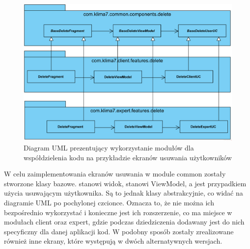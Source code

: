 \begin{figure}[ht!]
  \centering
  \includegraphics[width=\linewidth]{images/modules_example.png}
  \caption[Diagram UML prezentujący wykorzystanie modułów na przykładzie]{Diagram UML prezentujący wykorzystanie modułów dla współdzielenia kodu na przykładzie ekranów usuwania użytkowników}
  \label{fig:dziedziczenie}
\end{figure}

W celu zaimplementowania ekranów usuwania w module common zostały stworzone klasy bazowe.  stanowi widok,  stanowi ViewModel, a  jest przypadkiem użycia usuwającym użytkownika. Są to jednak klasy abstrakcyjnie, co widać na diagramie UML po pochylonej czcionce. Oznacza to, że nie można ich bezpośrednio wykorzystać i konieczne jest ich rozszerzenie, co ma miejsce w modułach client oraz expert, gdzie podczas dziedziczenia dodawany jest do nich specyficzny dla danej aplikacji kod. W podobny sposób zostały zrealizowane również inne ekrany, które występują w dwóch alternatywnych wersjach.